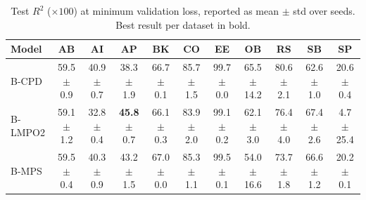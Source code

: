 \begin{table}[t]
\centering
\caption{Test $R^2$ ($\times 100$) at minimum validation loss, reported as mean \(\pm\) std over seeds. Best result per dataset in bold.}%
\label{tab:r2}
\begin{tabular}{lcccccccccc}
\toprule
Model & AB & AI & AP & BK & CO & EE & OB & RS & SB & SP \\
\midrule
\shortstack[l]{B-CPD \\ {}} & \shortstack{59.5 \\ $\pm$ 0.9} & \shortstack{40.9 \\ $\pm$ 0.7} & \shortstack{38.3 \\ $\pm$ 1.9} & \shortstack{66.7 \\ $\pm$ 0.1} & \shortstack{85.7 \\ $\pm$ 1.5} & \shortstack{99.7 \\ $\pm$ 0.0} & \shortstack{65.5 \\ $\pm$ 14.2} & \shortstack{80.6 \\ $\pm$ 2.1} & \shortstack{62.6 \\ $\pm$ 1.0} & \shortstack{20.6 \\ $\pm$ 0.4} \\
\midrule
\shortstack[l]{B-LMPO2 \\ {}} & \shortstack{59.1 \\ $\pm$ 1.2} & \shortstack{32.8 \\ $\pm$ 0.4} & \shortstack{\textbf{45.8} \\ $\pm$ 0.7} & \shortstack{66.1 \\ $\pm$ 0.3} & \shortstack{83.9 \\ $\pm$ 2.0} & \shortstack{99.1 \\ $\pm$ 0.2} & \shortstack{62.1 \\ $\pm$ 3.0} & \shortstack{76.4 \\ $\pm$ 4.0} & \shortstack{67.4 \\ $\pm$ 2.6} & \shortstack{4.7 \\ $\pm$ 25.4} \\
\midrule
\shortstack[l]{B-MPS \\ {}} & \shortstack{59.5 \\ $\pm$ 0.4} & \shortstack{40.3 \\ $\pm$ 0.9} & \shortstack{43.2 \\ $\pm$ 1.5} & \shortstack{67.0 \\ $\pm$ 0.0} & \shortstack{85.3 \\ $\pm$ 1.1} & \shortstack{99.5 \\ $\pm$ 0.1} & \shortstack{54.0 \\ $\pm$ 16.6} & \shortstack{73.7 \\ $\pm$ 1.8} & \shortstack{66.6 \\ $\pm$ 1.2} & \shortstack{20.2 \\ $\pm$ 0.1} \\

\end{tabular}
\end{table}
